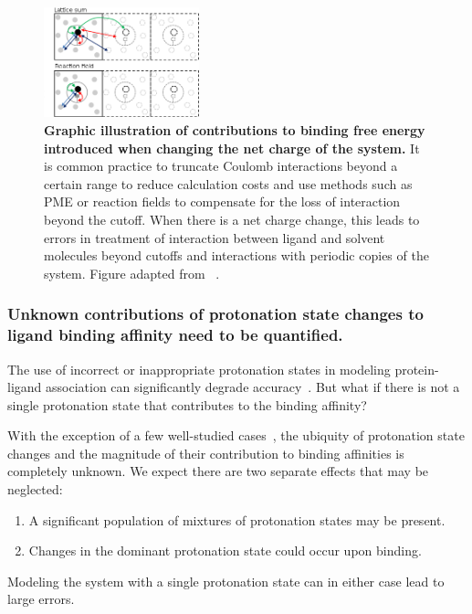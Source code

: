 \documentclass[10pt,final]{article}
\begin{document}
\begin{figure}[H]
  \centering
  \includegraphics[width=0.4\textwidth]{figures/reif_oostenbrink.png}
    \caption{\textbf{Graphic illustration of contributions to binding free energy introduced when changing the net charge of the system.}  It is common practice to truncate Coulomb interactions beyond a certain range to reduce calculation costs and use methods such as PME or reaction fields to compensate for the loss of interaction beyond the cutoff. When there is a net charge change, this leads to errors in treatment of interaction between ligand and solvent molecules beyond cutoffs and interactions with periodic copies of the system. Figure adapted from ~\textcite{Reif2013a}.}
  \label{figure:chargecorrections}
\end{figure}

\subsubsection*{Unknown contributions of protonation state changes to ligand binding affinity need to be quantified.}
The use of incorrect or inappropriate protonation states in modeling protein-ligand association can significantly degrade accuracy~\cite{Polgar2005a,Wittayanarakul2008a}.
But what if there is not a single protonation state that contributes to the binding affinity?

With the exception of a few well-studied cases~\cite{Aleksandrov2007a,Czodrowski2007a,Steuber2007a,Czodrowski2007b},  %
the ubiquity of protonation state changes and the magnitude of their contribution to binding affinities is completely unknown. 
%
We expect there are two separate effects that may be neglected:
\begin{enumerate}
 \item A significant population of mixtures of protonation states may be present.
 \item Changes in the dominant protonation state could occur upon binding.
\end{enumerate}
%
Modeling the system with a single protonation state can in either case lead to large errors.
\end{document}
